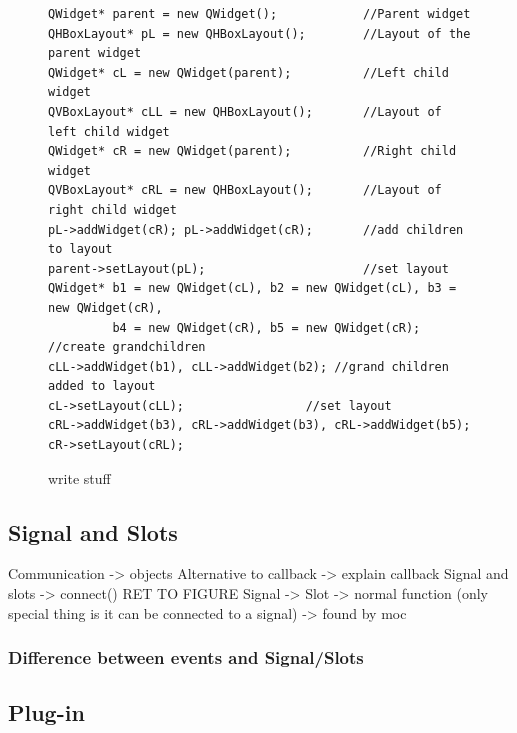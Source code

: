 \begin{figure}[h]
\centering
\lstset{language=C++} 
\begin{lstlisting}[frame=single]  
QWidget* parent = new QWidget();  			//Parent widget
QHBoxLayout* pL = new QHBoxLayout();		//Layout of the parent widget
QWidget* cL = new QWidget(parent); 			//Left child widget
QVBoxLayout* cLL = new QHBoxLayout();		//Layout of left child widget
QWidget* cR = new QWidget(parent); 			//Right child widget
QVBoxLayout* cRL = new QHBoxLayout();		//Layout of right child widget
pL->addWidget(cR); pL->addWidget(cR);		//add children to layout
parent->setLayout(pL);						//set layout
QWidget* b1 = new QWidget(cL), b2 = new QWidget(cL), b3 = new QWidget(cR),
		 b4 = new QWidget(cR), b5 = new QWidget(cR); //create grandchildren
cLL->addWidget(b1), cLL->addWidget(b2);	//grand children added to layout
cL->setLayout(cLL);					//set layout
cRL->addWidget(b3), cRL->addWidget(b3), cRL->addWidget(b5);				 
cR->setLayout(cRL);			 
\end{lstlisting}
\caption{write stuff}
\label{fig:QLayoutCode} 	
\end{figure}


\subsection{Signal and Slots}
\label{sec:signalandslots}
Communication -> objects
Alternative to callback -> explain callback
Signal and slots -> connect() RET TO FIGURE
Signal -> 
Slot -> normal function (only special thing is it can be connected to a signal) -> found by moc
\subsubsection{Difference between events and Signal/Slots}

\subsection{Plug-in}
\label{sec:plugin}

